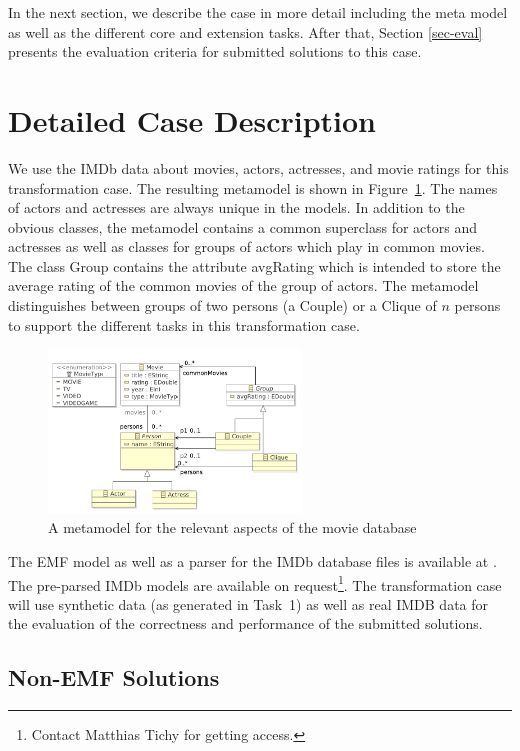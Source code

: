 \documentclass[a4paper,11pt]{article}
\newcommand{\p}[1]{\textsf{\small #1}}
\begin{document}
In the next section, we describe the case in more detail
including the meta model as well as the different core and extension
tasks. After that, Section \ref{sec-eval} presents the evaluation
criteria for submitted solutions to this case.


\section{Detailed Case Description}\label{sec-case}

We use the IMDb data about movies, actors, actresses, and movie ratings for
this transformation case. The resulting metamodel is shown in
Figure~\ref{fig:metamodel}.  The names of actors and actresses are always
unique in the models.  In addition to the obvious classes, the metamodel
contains a common superclass for actors and actresses as well as classes for
groups of actors which play in common movies. The class \p{Group} contains the
attribute \p{avgRating} which is intended to store the average rating of the
common movies of the group of actors. The metamodel distinguishes between
groups of two persons (a \p{Couple}) or a \p{Clique} of $n$ persons to support
the different tasks in this transformation case.

\begin{figure}[ht]
\centering
\includegraphics[width=0.6\textwidth]{movies}
\caption{A metamodel for the relevant aspects of the movie database}
\label{fig:metamodel}
\end{figure}

The EMF model as well as a parser for the IMDb database files is available at
\cite{IMDB2EMF}. The pre-parsed IMDb models are available on
request\footnote{\label{imdb-access}Contact Matthias Tichy for getting
  access.}. The transformation case will use synthetic data (as generated in
Task~1) as well as real IMDB data for the evaluation of the correctness and
performance of the submitted solutions.

\subsection*{Non-EMF Solutions}
\label{sec:non-emf-solutions}
\end{document}
